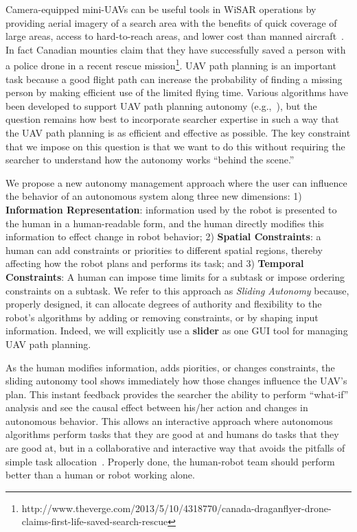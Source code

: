 \documentclass[lettersize, apacite, twoside, HRI]{apa_HRI}
\begin{document}
Camera-equipped mini-UAVs can be useful tools in WiSAR operations by providing aerial imagery of a search area with the benefits of quick coverage of large areas, access to hard-to-reach areas, and lower cost than manned aircraft~\cite{Murphy2008Cooperative, Goodrich2008Supporting}. In fact Canadian mounties claim that they have successfully saved a person with a police drone in a recent rescue mission\footnote{http://www.theverge.com/2013/5/10/4318770/canada-draganflyer-drone-claims-first-life-saved-search-rescue}. UAV path planning is an important task because a good flight path can increase the probability of finding a missing person by making efficient use of the limited flying time. Various algorithms have been developed to support UAV path planning autonomy (e.g.,~\cite{Bourgault2003Coordinated, Lin2009UAV, Lin2014Hierarchical}), but the question remains how best to incorporate searcher expertise in such a way that the UAV path planning is as efficient and effective as possible.  The key constraint that we impose on this question is that we want to do this without requiring the searcher to understand how the autonomy works ``behind the scene.''
 
We propose a new autonomy management approach where the user can influence the behavior of an autonomous system along three new dimensions: 1) \textbf{Information Representation}: information used by the robot is presented to the human in a human-readable form, and the human directly modifies this information to effect change in robot behavior; 2) \textbf{Spatial Constraints}: a human can add constraints or priorities to different spatial regions, thereby affecting how the robot plans and performs its task; and 3) \textbf{Temporal Constraints}: A human can impose time limits for a subtask or impose ordering constraints on a subtask. We refer to this approach as \textit{Sliding Autonomy} because, properly designed, it can allocate degrees of authority and flexibility to the robot's algorithms by adding or removing constraints, or by shaping input information. Indeed, we will explicitly use a \textbf{slider} as one GUI tool for managing UAV path planning.

As the human modifies information, adds piorities, or changes constraints, the sliding autonomy tool shows immediately how those changes influence the UAV's plan. This instant feedback provides the searcher the ability to perform ``what-if'' analysis and see the causal effect between his/her action and changes in autonomous behavior. This allows an interactive approach where autonomous algorithms perform tasks that they are good at and humans do tasks that they are good at, but in a collaborative and interactive way that avoids the pitfalls of simple task allocation~\cite{Sheridan1992Telerobotics,Bradshaw2013Seven}. Properly done, the human-robot team should perform better than a human or robot working alone. 
\end{document}
